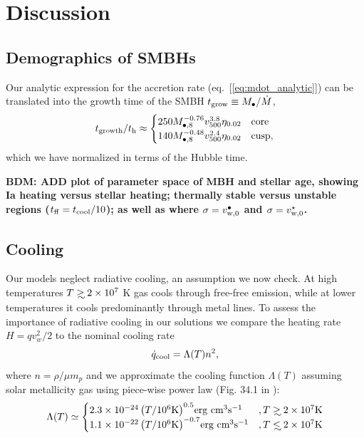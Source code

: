 \documentclass[usenatbib,fleqn]{mn2e}
\newcommand\lsim{\mathrel{\rlap{\lower4pt\hbox{\hskip1pt$\sim$}}
    \raise1pt\hbox{$<$}}}
\newcommand\gsim{\mathrel{\rlap{\lower4pt\hbox{\hskip1pt$\sim$}}
    \raise1pt\hbox{$>$}}}
\newcommand{\vw}{v_w}
\newcommand{\Mbheight}{M_{\bullet,8}}
\begin{document}
\section{Discussion}
\label{sec:discussion}

\subsection{Demographics of SMBHs}

Our analytic expression for the accretion rate (eq.~[\ref{eq:mdot_analytic}]) can be translated into the growth time of the SMBH $t_{\rm grow} \equiv M_{\bullet}/\dot{M}$,
\begin{eqnarray}
  t_{\rm growth}/t_{\rm h} \approx 
  \begin{cases}
    250 M_{\bullet,8}^{-0.76}
    v_{500}^{3.8}   \eta_{0.02}  & \text{core} \\
    140 \Mbheight^{-0.48}
    v_{500}^{2.4}   \eta_{0.02}  & \text{cusp}, 
  \end{cases}
  \label{eq:tgrow_analytic}
\end{eqnarray}
which we have normalized in terms of the Hubble time.  

{\bf BDM: ADD plot of parameter space of MBH and stellar age, showing Ia heating versus stellar heating; thermally stable versus unstable regions ($t_{\rm ff} = t_{\rm cool}/10$); as well as where $\sigma = v_{\rm w,0}^{\bullet}$ and $\sigma = v_{\rm w,0}^{\star}$.  }

\subsection{Cooling}
\label{sec:cooling}
Our models neglect radiative cooling, an assumption we now check.  At high temperatures $T\gsim 2\times 10^7$ K gas cools through free-free emission, while at lower temperatures it cools predominantly through metal lines.  To assess the importance of radiative cooling in our solutions we compare the heating rate $H=q \vw^2/2$ to the nominal cooling rate
\begin{align}
  \dot{q}_{\rm cool} =\Lambda(T) n^2,
\label{eq:cooling}
\end{align}
where $n = \rho/\mu m_p$ and we approximate the cooling function $\Lambda(T)$ assuming solar metallicity gas using piece-wise power law (Fig. 34.1 in \cite{Draine:2011a}):
\begin{align}
\Lambda(T)\simeq
  \begin{cases}
    2.3 \times 10^{-24} \left(T/10^6 \text{K}\right)^{0.5} $erg cm$^3 $s$^{-1}&, T \gsim 2 \times 10^7 \text{K} \\
    1.1 \times 10^{-22} \left(T/10^6 \text{K}\right)^{-0.7}  $erg cm$^3 $s$^{-1}&, T \lsim 2 \times 10^7 \text{K}     
  \end{cases}
  \label{eq:cooling2}
\end{align}
\end{document}
